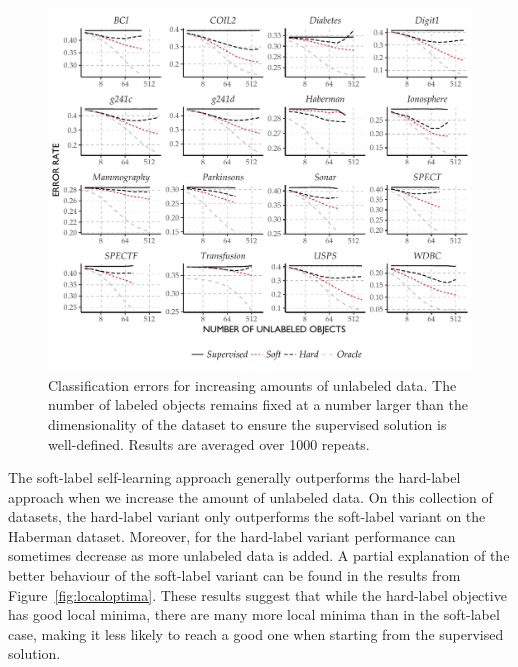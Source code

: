 \documentclass[twoside]{memoir}\usepackage[]{graphicx}\usepackage{xcolor}
\makeatletter
\def\maxwidth{ %
  \ifdim\Gin@nat@width>\linewidth
    \linewidth
  \else
    \Gin@nat@width
  \fi
}
\newenvironment{knitrout}{}{} %
\makeatother
\begin{document}
\begin{knitrout}
\color{fgcolor}\begin{figure}
\includegraphics[width=\maxwidth]{figure/learningcurves-1} \caption[Classification errors for increasing amounts of unlabeled data]{Classification errors for increasing amounts of unlabeled data. The number of labeled objects remains fixed at a number larger than the dimensionality of the dataset to ensure the supervised solution is well-defined. Results are averaged over 1000 repeats.}\label{fig:learningcurves}
\end{figure}


\end{knitrout}
The soft-label self-learning approach generally outperforms the hard-label approach when we increase the amount of unlabeled data. On this collection of datasets, the hard-label variant only outperforms the soft-label variant on the Haberman dataset. Moreover, for the hard-label variant performance can sometimes decrease as more unlabeled data is added. A partial explanation of the better behaviour of the soft-label variant can be found in the results from Figure~\ref{fig:localoptima}. These results suggest that while the hard-label objective has good local minima, there are many more local minima than in the soft-label case, making it less likely to reach a good one when starting from the supervised solution.
\end{document}
